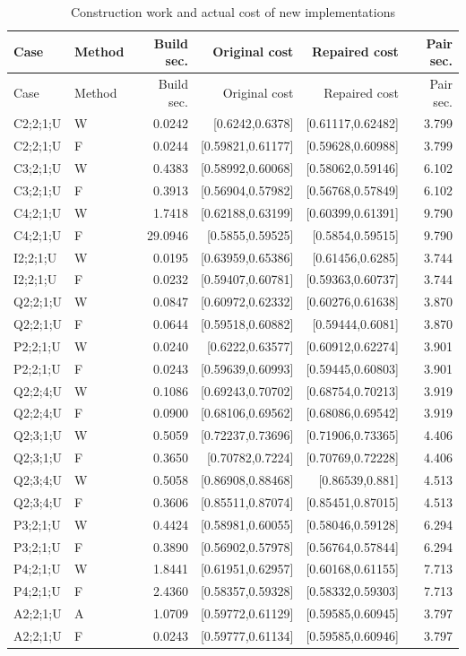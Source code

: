 {\small
\setlength{\tabcolsep}{3pt}
\begin{longtable}{@{}llrrrr@{}}
\caption{Construction work and actual cost of new implementations}\label{tab:joint50}\\
\toprule
Case & Method & Build sec. & Original cost & Repaired cost & Pair sec. \\
\midrule
\endfirsthead
\toprule
Case & Method & Build sec. & Original cost & Repaired cost & Pair sec. \\
\midrule
\endhead
\bottomrule
\endfoot
C2;2;1;U & W & 0.0242 & [0.6242,0.6378] & [0.61117,0.62482] & 3.799 \\
C2;2;1;U & F & 0.0244 & [0.59821,0.61177] & [0.59628,0.60988] & 3.799 \\
C3;2;1;U & W & 0.4383 & [0.58992,0.60068] & [0.58062,0.59146] & 6.102 \\
C3;2;1;U & F & 0.3913 & [0.56904,0.57982] & [0.56768,0.57849] & 6.102 \\
C4;2;1;U & W & 1.7418 & [0.62188,0.63199] & [0.60399,0.61391] & 9.790 \\
C4;2;1;U & F & 29.0946 & [0.5855,0.59525] & [0.5854,0.59515] & 9.790 \\
I2;2;1;U & W & 0.0195 & [0.63959,0.65386] & [0.61456,0.6285] & 3.744 \\
I2;2;1;U & F & 0.0232 & [0.59407,0.60781] & [0.59363,0.60737] & 3.744 \\
Q2;2;1;U & W & 0.0847 & [0.60972,0.62332] & [0.60276,0.61638] & 3.870 \\
Q2;2;1;U & F & 0.0644 & [0.59518,0.60882] & [0.59444,0.6081] & 3.870 \\
P2;2;1;U & W & 0.0240 & [0.6222,0.63577] & [0.60912,0.62274] & 3.901 \\
P2;2;1;U & F & 0.0243 & [0.59639,0.60993] & [0.59445,0.60803] & 3.901 \\
Q2;2;4;U & W & 0.1086 & [0.69243,0.70702] & [0.68754,0.70213] & 3.919 \\
Q2;2;4;U & F & 0.0900 & [0.68106,0.69562] & [0.68086,0.69542] & 3.919 \\
Q2;3;1;U & W & 0.5059 & [0.72237,0.73696] & [0.71906,0.73365] & 4.406 \\
Q2;3;1;U & F & 0.3650 & [0.70782,0.7224] & [0.70769,0.72228] & 4.406 \\
Q2;3;4;U & W & 0.5058 & [0.86908,0.88468] & [0.86539,0.881] & 4.513 \\
Q2;3;4;U & F & 0.3606 & [0.85511,0.87074] & [0.85451,0.87015] & 4.513 \\
P3;2;1;U & W & 0.4424 & [0.58981,0.60055] & [0.58046,0.59128] & 6.294 \\
P3;2;1;U & F & 0.3890 & [0.56902,0.57978] & [0.56764,0.57844] & 6.294 \\
P4;2;1;U & W & 1.8441 & [0.61951,0.62957] & [0.60168,0.61155] & 7.713 \\
P4;2;1;U & F & 2.4360 & [0.58357,0.59328] & [0.58332,0.59303] & 7.713 \\
A2;2;1;U & A & 1.0709 & [0.59772,0.61129] & [0.59585,0.60945] & 3.797 \\
A2;2;1;U & F & 0.0243 & [0.59777,0.61134] & [0.59585,0.60946] & 3.797 \\
\end{longtable}
}
